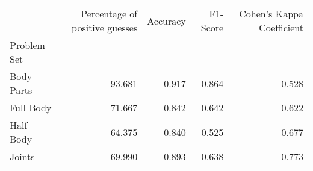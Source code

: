 \begin{table}
    \caption[]{}
    \label{}
    \begin{tabular}{lrrrr}
\hline
{} &  Percentage of positive guesses &  Accuracy &  F1-Score &  Cohen's Kappa Coefficient \\
Problem Set   &                                 &           &           &                            \\
\hline
Body Parts &                          93.681 &     0.917 &     0.864 &                      0.528 \\
Full Body  &                          71.667 &     0.842 &     0.642 &                      0.622 \\
Half Body  &                          64.375 &     0.840 &     0.525 &                      0.677 \\
Joints     &                          69.990 &     0.893 &     0.638 &                      0.773 \\
\hline
\end{tabular}

\end{table}